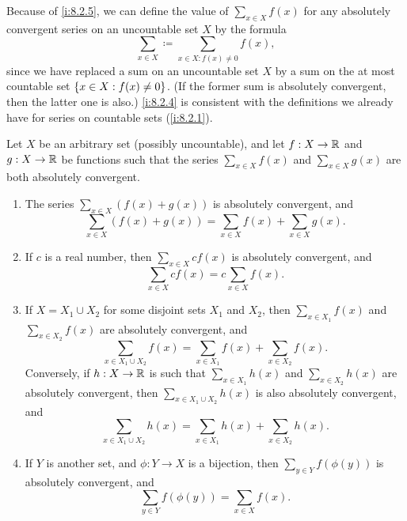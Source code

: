 \begin{note}
  Because of \cref{i:8.2.5}, we can define the value of \(\sum_{x \in X} f(x)\) for any absolutely convergent series on an uncountable set \(X\) by the formula
  \[
    \sum_{x \in X} \coloneqq \sum_{x \in X : f(x) \neq 0} f(x),
  \]
  since we have replaced a sum on an uncountable set \(X\) by a sum on the at most countable set \(\left\lbrace x \in X : f(x) \neq 0\right\rbrace\).
  (If the former sum is absolutely convergent, then the latter one is also.)
  \cref{i:8.2.4} is consistent with the definitions we already have for series on countable sets (\cref{i:8.2.1}).
\end{note}

\begin{prop}\label{i:8.2.6}
  Let \(X\) be an arbitrary set (possibly uncountable), and let \(f : X \to \mathbb{R}\) and \(g : X \to \mathbb{R}\) be functions such that the series \(\sum_{x \in X} f(x)\) and \(\sum_{x \in X} g(x)\) are both absolutely convergent.
  \begin{enumerate}
    \item The series \(\sum_{x \in X} (f(x) + g(x))\) is absolutely convergent, and
          \[
            \sum_{x \in X} (f(x) + g(x)) = \sum_{x \in X} f(x) + \sum_{x \in X} g(x).
          \]
    \item If \(c\) is a real number, then \(\sum_{x \in X} cf(x)\) is absolutely convergent, and
          \[
            \sum_{x \in X} cf(x) = c \sum_{x \in X} f(x).
          \]
    \item If \(X = X_1 \cup X_2\) for some disjoint sets \(X_1\) and \(X_2\), then \(\sum_{x \in X_1} f(x)\) and \\
          \(\sum_{x \in X_2} f(x)\) are absolutely convergent, and
          \[
            \sum_{x \in X_1 \cup X_2} f(x) = \sum_{x \in X_1} f(x) + \sum_{x \in X_2} f(x).
          \]
          Conversely, if \(h : X \to \mathbb{R}\) is such that \(\sum_{x \in X_1} h(x)\) and \(\sum_{x \in X_2} h(x)\) are absolutely convergent, then \(\sum_{x \in X_1 \cup X_2} h(x)\) is also absolutely convergent, and
          \[
            \sum_{x \in X_1 \cup X_2} h(x) = \sum_{x \in X_1} h(x) + \sum_{x \in X_2} h(x).
          \]
    \item If \(Y\) is another set, and \(\phi : Y \to X\) is a bijection, then \(\sum_{y \in Y} f(\phi(y))\) is absolutely convergent, and
          \[
            \sum_{y \in Y} f(\phi(y)) = \sum_{x \in X} f(x).
          \]
  \end{enumerate}
\end{prop}

